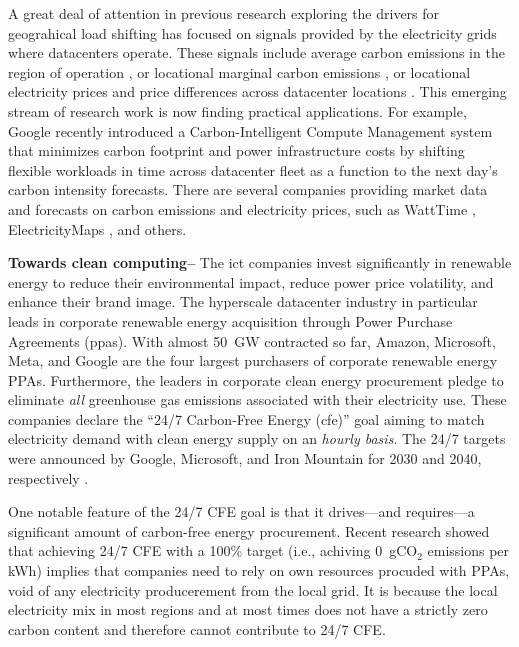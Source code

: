 A great deal of attention in previous research exploring the drivers for geograhical load shifting has focused on signals provided by the electricity grids where datacenters operate. These signals include average carbon emissions in the region of operation \cite{zhengMitigatingCurtailmentCarbon2020}, or locational marginal carbon emissions \cite{lindbergEnvironmentalPotentialHyperScale2021}, or locational electricity prices and price differences across datacenter locations \cite{raoMinimizingElectricityCost2010,tranHowGeoDistributedData2016, zhangRemuneratingSpaceTime2022}. This emerging stream of research work is now finding practical applications. For example, Google recently introduced a Carbon-Intelligent Compute Management system that minimizes carbon footprint and power infrastructure costs by shifting flexible workloads in time  across datacenter fleet as a function to the next day's carbon intensity forecasts. \cite{radovanovicIEEE2023} There are several companies providing market data and forecasts on carbon emissions and electricity prices, such as WattTime \cite{WattTime}, ElectricityMaps \cite{ElectricityMaps}, and others.

\textbf{Towards clean computing--} The \gls{ict} companies invest significantly in renewable energy to reduce their environmental impact, reduce power price volatility, and enhance their brand image. The hyperscale datacenter industry in particular leads in corporate renewable energy acquisition through Power Purchase Agreements (\gls{ppa}s). With almost 50~GW contracted so far, Amazon, Microsoft, Meta, and Google are the four largest purchasers of corporate renewable energy PPAs. \cite{ieaDataCentresData2023} Furthermore, the leaders in corporate clean energy procurement pledge to eliminate \textit{all} greenhouse gas emissions associated with their electricity use. These companies declare the \enquote{24/7 Carbon-Free Energy (\gls{cfe})} goal aiming to match electricity demand with clean energy supply on an \textit{hourly basis}. The 24/7 targets were announced by Google, Microsoft, and Iron Mountain for 2030 and 2040, respectively \cite{google-247by2030, Microsoft-vision, IronMountainSustainability}.

One notable feature of the 24/7 CFE goal is that it drives---and requires---a significant amount of carbon-free energy procurement. Recent research showed that achieving 24/7 CFE with a 100\% target (i.e., achiving 0~gCO$_2$ emissions per kWh) implies that companies need to rely on own resources procuded with PPAs, void of any electricity producerement from the local grid. \cite{riepinMeansCostsSystemlevel2023, riepin-zenodo-systemlevel247} It is because the local electricity mix in most regions and at most times does not have a strictly zero carbon content and therefore cannot contribute to 24/7 CFE.

